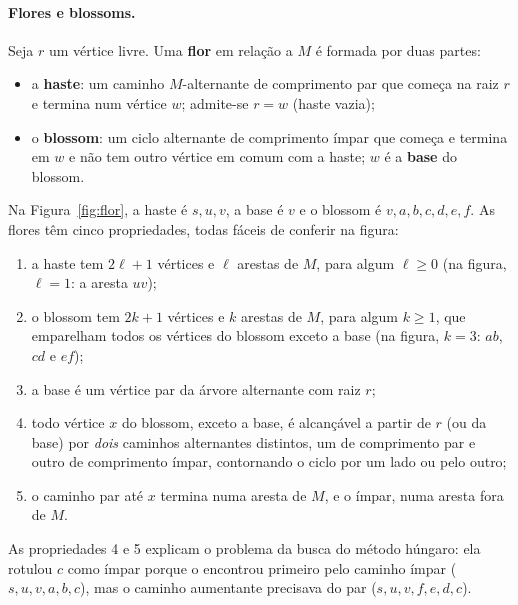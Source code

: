\paragraph{Flores e blossoms.} Seja $r$ um vértice livre. Uma \textbf{flor} em relação a $M$ é formada por duas partes:
\begin{itemize}
  \item a \textbf{haste}: um caminho $M$-alternante de comprimento par que começa na raiz $r$ e termina num vértice $w$; admite-se $r=w$ (haste vazia);
  \item o \textbf{blossom}: um ciclo alternante de comprimento ímpar que começa e termina em $w$ e não tem outro vértice em comum com a haste; $w$ é a \textbf{base} do blossom.
\end{itemize}
Na Figura~\ref{fig:flor}, a haste é $s,u,v$, a base é $v$ e o blossom é $v,a,b,c,d,e,f$. As flores têm cinco propriedades, todas fáceis de conferir na figura:
\begin{enumerate}
  \item a haste tem $2\ell+1$ vértices e $\ell$ arestas de $M$, para algum $\ell\ge0$ (na figura, $\ell=1$: a aresta $uv$);
  \item o blossom tem $2k+1$ vértices e $k$ arestas de $M$, para algum $k\ge1$, que emparelham todos os vértices do blossom exceto a base (na figura, $k=3$: $ab$, $cd$ e $ef$);
  \item a base é um vértice par da árvore alternante com raiz $r$;
  \item todo vértice $x$ do blossom, exceto a base, é alcançável a partir de $r$ (ou da base) por \emph{dois} caminhos alternantes distintos, um de comprimento par e outro de comprimento ímpar, contornando o ciclo por um lado ou pelo outro;
  \item o caminho par até $x$ termina numa aresta de $M$, e o ímpar, numa aresta fora de $M$.
\end{enumerate}
As propriedades 4 e 5 explicam o problema da busca do método húngaro: ela rotulou $c$ como ímpar porque o encontrou primeiro pelo caminho ímpar ($s,u,v,a,b,c$), mas o caminho aumentante precisava do par ($s,u,v,f,e,d,c$).

